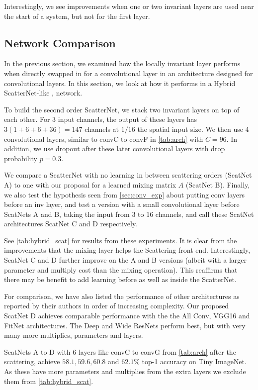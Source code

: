 Interestingly, we see improvements when one or two invariant layers are used near the
start of a system, but not for the first layer. 


\subsection{Network Comparison}\label{sec:scat_exp}
In the previous section, we examined how the locally invariant layer performs when
directly swapped in for a convolutional layer in an architecture designed
for convolutional layers. In this section, we look at how
it performs in a Hybrid ScatterNet-like \cite{oyallon_hybrid_2017,oyallon_scaling_2017},
network.

To build the second order ScatterNet, we stack two invariant layers on top of each
other. For 3 input channels, the output of these layers has $3(1 +
6 + 6 +36) = 147$ channels at $1/16$ the spatial input size. We then use 4
convolutional layers, similar to convC to convF in \autoref{tab:arch} with
$C=96$. In addition, we use dropout after these later convolutional layers with drop probability $p=0.3$.

We compare a ScatterNet with no learning in between scattering orders
(ScatNet A) to one with our proposal for a learned mixing matrix $A$ (ScatNet B). Finally,
we also test the hypothesis seen from \autoref{sec:conv_exp} about putting conv
layers before an inv layer, and test a version with a small convolutional layer
before ScatNets A and B, taking the input from 3 to 16 channels, and call these ScatNet
architectures ScatNet C and D respectively.

See \autoref{tab:hybrid_scat} for results from these experiments. It is clear from
the improvements that the mixing layer helps the Scattering front end.
Interestingly, ScatNet C and D further improve on the A and B versions
(albeit with a larger parameter and multiply cost than the mixing operation). This reaffirms that there
may be benefit to add learning before as well as inside the ScatterNet.

For comparison, we have also listed the performance of other architectures as
reported by their authors in order of increasing complexity. Our proposed ScatNet D achieves
comparable performance with the the All Conv, VGG16 and FitNet architectures.
The Deep\cite{he_identity_2016} and Wide\cite{zagoruyko_wide_2016}
ResNets perform best, but with very many more
multiplies, parameters and layers.

ScatNets A to D with 6 layers like convC to convG from \autoref{tab:arch} after
the scattering, achieve $58.1, 59.6, 60.8$ and $62.1\%$ top-1 accuracy on Tiny ImageNet. As
these have more parameters and multiplies from the extra layers we exclude them
from \autoref{tab:hybrid_scat}.

